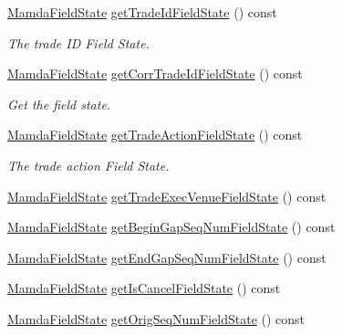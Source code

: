 \begin{CompactItemize}
\hyperlink{namespaceWombat_93aac974f2ab713554fd12a1fa3b7d2a}{Mamda\-Field\-State} \hyperlink{classWombat_1_1MamdaTradeListener_2475e2a2f9dd0cbd3425b64f84beb258}{get\-Trade\-Id\-Field\-State} () const 
\begin{CompactList}\small\item\em The trade ID Field State. \item\end{CompactList}\item 
\hyperlink{namespaceWombat_93aac974f2ab713554fd12a1fa3b7d2a}{Mamda\-Field\-State} \hyperlink{classWombat_1_1MamdaTradeListener_8598485802bcf8f1290f36ecfa964d99}{get\-Corr\-Trade\-Id\-Field\-State} () const 
\begin{CompactList}\small\item\em Get the field state. \item\end{CompactList}\item 
\hyperlink{namespaceWombat_93aac974f2ab713554fd12a1fa3b7d2a}{Mamda\-Field\-State} \hyperlink{classWombat_1_1MamdaTradeListener_bf9d994153ef2fa8b823517c2a061a28}{get\-Trade\-Action\-Field\-State} () const 
\begin{CompactList}\small\item\em The trade action Field State. \item\end{CompactList}\item 
\hyperlink{namespaceWombat_93aac974f2ab713554fd12a1fa3b7d2a}{Mamda\-Field\-State} \hyperlink{classWombat_1_1MamdaTradeListener_7d9d76da5b8194ec576c69fba05eb5d7}{get\-Trade\-Exec\-Venue\-Field\-State} () const 
\item 
\hyperlink{namespaceWombat_93aac974f2ab713554fd12a1fa3b7d2a}{Mamda\-Field\-State} \hyperlink{classWombat_1_1MamdaTradeListener_95aa1252a009b9d4805205cf776557eb}{get\-Begin\-Gap\-Seq\-Num\-Field\-State} () const 
\item 
\hyperlink{namespaceWombat_93aac974f2ab713554fd12a1fa3b7d2a}{Mamda\-Field\-State} \hyperlink{classWombat_1_1MamdaTradeListener_dccea0e36079c7120b9d63506b0f0543}{get\-End\-Gap\-Seq\-Num\-Field\-State} () const 
\item 
\hyperlink{namespaceWombat_93aac974f2ab713554fd12a1fa3b7d2a}{Mamda\-Field\-State} \hyperlink{classWombat_1_1MamdaTradeListener_58e1fb7013e2858c0d870db1e31e9f3b}{get\-Is\-Cancel\-Field\-State} () const 
\item 
\hyperlink{namespaceWombat_93aac974f2ab713554fd12a1fa3b7d2a}{Mamda\-Field\-State} \hyperlink{classWombat_1_1MamdaTradeListener_0767574a3f0c34ae680fbbfadf296e0e}{get\-Orig\-Seq\-Num\-Field\-State} () const 

\end{CompactItemize}
